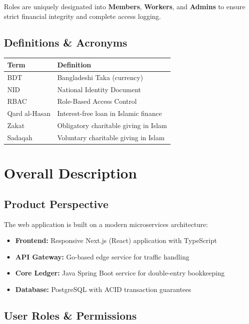 \documentclass[11pt,a4paper]{article}
\begin{document}
Roles are uniquely designated into \textbf{Members}, \textbf{Workers}, and \textbf{Admins} to ensure strict financial integrity and complete access logging.

\subsection{Definitions \& Acronyms}

\begin{tabular}{@{}p{3cm}p{10cm}@{}}
\toprule
\textbf{Term} & \textbf{Definition} \\
\midrule
BDT & Bangladeshi Taka (currency) \\
NID & National Identity Document \\
RBAC & Role-Based Access Control \\
Qard al-Hasan & Interest-free loan in Islamic finance \\
Zakat & Obligatory charitable giving in Islam \\
Sadaqah & Voluntary charitable giving in Islam \\
\bottomrule
\end{tabular}

\section{Overall Description}

\subsection{Product Perspective}
The web application is built on a modern microservices architecture:
\begin{itemize}
    \item \textbf{Frontend:} Responsive Next.js (React) application with TypeScript
    \item \textbf{API Gateway:} Go-based edge service for traffic handling
    \item \textbf{Core Ledger:} Java Spring Boot service for double-entry bookkeeping
    \item \textbf{Database:} PostgreSQL with ACID transaction guarantees
\end{itemize}

\subsection{User Roles \& Permissions}
\end{document}
